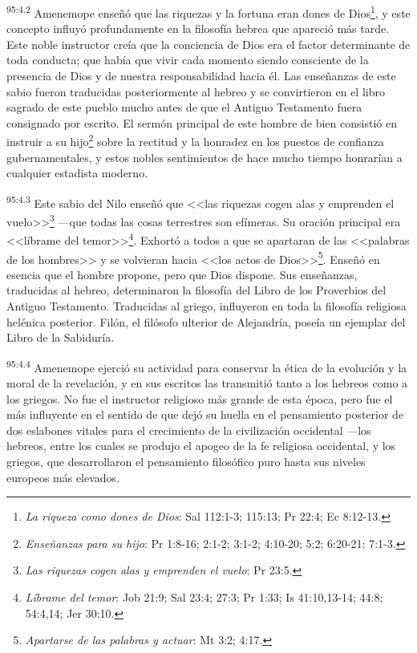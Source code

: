 \par
\textsuperscript{95:4.2} Amenemope enseñó que las riquezas y la fortuna eran dones de Dios\footnote{\textit{La riqueza como dones de Dios}: Sal 112:1-3; 115:13; Pr 22:4; Ec 8:12-13.}, y este concepto influyó profundamente en la filosofía hebrea que apareció más tarde. Este noble instructor creía que la conciencia de Dios era el factor determinante de toda conducta; que había que vivir cada momento siendo consciente de la presencia de Dios y de nuestra responsabilidad hacia él. Las enseñanzas de este sabio fueron traducidas posteriormente al hebreo y se convirtieron en el libro sagrado de este pueblo mucho antes de que el Antiguo Testamento fuera consignado por escrito. El sermón principal de este hombre de bien consistió en instruir a su hijo\footnote{\textit{Enseñanzas para su hijo}: Pr 1:8-16; 2:1-2; 3:1-2; 4:10-20; 5:2; 6:20-21; 7:1-3.} sobre la rectitud y la honradez en los puestos de confianza gubernamentales, y estos nobles sentimientos de hace mucho tiempo honrarían a cualquier estadista moderno.

\par
\textsuperscript{95:4.3} Este sabio del Nilo enseñó que <<las riquezas cogen alas y emprenden el vuelo>>\footnote{\textit{Las riquezas cogen alas y emprenden el vuelo}: Pr 23:5.} ---que todas las cosas terrestres son efímeras. Su oración principal era <<líbrame del temor>>\footnote{\textit{Líbrame del temor}: Job 21:9; Sal 23:4; 27:3; Pr 1:33; Is 41:10,13-14; 44:8; 54:4,14; Jer 30:10.}. Exhortó a todos a que se apartaran de las <<palabras de los hombres>> y se volvieran hacia <<los actos de Dios>>\footnote{\textit{Apartarse de las palabras y actuar}: Mt 3:2; 4:17.}. Enseñó en esencia que el hombre propone, pero que Dios dispone. Sus enseñanzas, traducidas al hebreo, determinaron la filosofía del Libro de los Proverbios del Antiguo Testamento. Traducidas al griego, influyeron en toda la filosofía religiosa helénica posterior. Filón, el filósofo ulterior de Alejandría, poseía un ejemplar del Libro de la Sabiduría.

\par
\textsuperscript{95:4.4} Amenemope ejerció su actividad para conservar la ética de la evolución y la moral de la revelación, y en sus escritos las transmitió tanto a los hebreos como a los griegos. No fue el instructor religioso más grande de esta época, pero fue el más influyente en el sentido de que dejó su huella en el pensamiento posterior de dos eslabones vitales para el crecimiento de la civilización occidental ---los hebreos, entre los cuales se produjo el apogeo de la fe religiosa occidental, y los griegos, que desarrollaron el pensamiento filosófico puro hasta sus niveles europeos más elevados.

